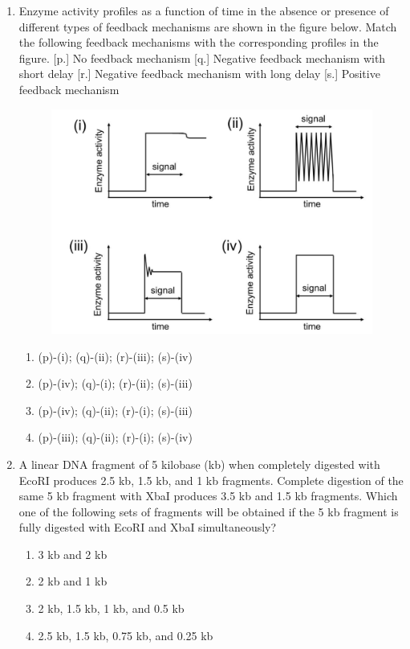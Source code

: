 \documentclass[journal,12pt,onecolumn]{IEEEtran}
\begin{document}
\begin{enumerate}
    \item Enzyme activity profiles as a function of time in the absence or presence of different types of feedback mechanisms are shown in the figure below. Match the following feedback mechanisms with the corresponding profiles in the figure.
        [p.] No feedback mechanism
        [q.] Negative feedback mechanism with short delay
        [r.] Negative feedback mechanism with long delay
        [s.] Positive feedback mechanism
\begin{figure}[H]
		\centering
            \includegraphics{38}
		    \caption*{}
		\label{fig:Q38}
	\end{figure}
    \begin{enumerate}
        \item (p)-(i); (q)-(ii); (r)-(iii); (s)-(iv)
        \item (p)-(iv); (q)-(i); (r)-(ii); (s)-(iii)
        \item (p)-(iv); (q)-(ii); (r)-(i); (s)-(iii)
        \item (p)-(iii); (q)-(ii); (r)-(i); (s)-(iv)
    \end{enumerate}

    \item A linear DNA fragment of 5 kilobase (kb) when completely digested with EcoRI produces 2.5 kb, 1.5 kb, and 1 kb fragments. Complete digestion of the same 5 kb fragment with XbaI produces 3.5 kb and 1.5 kb fragments. Which one of the following sets of fragments will be obtained if the 5 kb fragment is fully digested with EcoRI and XbaI simultaneously?
    \begin{enumerate}
        \item 3 kb and 2 kb
        \item 2 kb and 1 kb
        \item 2 kb, 1.5 kb, 1 kb, and 0.5 kb
        \item 2.5 kb, 1.5 kb, 0.75 kb, and 0.25 kb
    \end{enumerate}


\end{enumerate}
\end{document}
